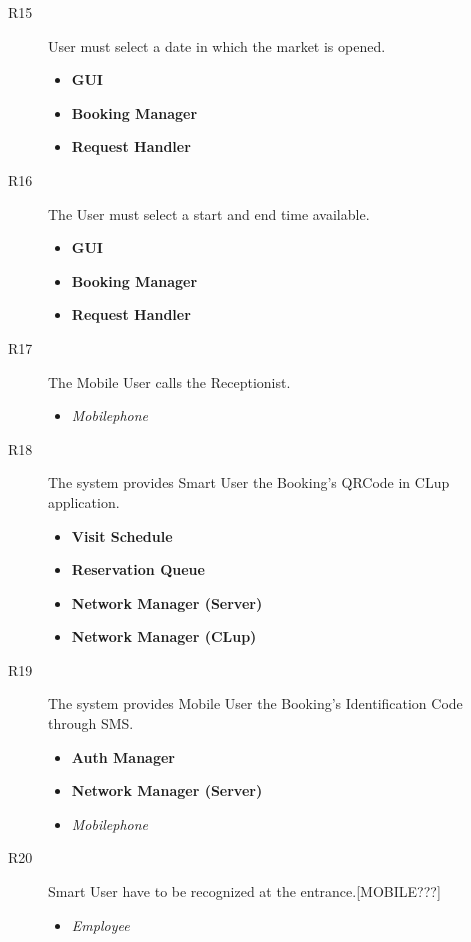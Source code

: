 \begin{description}
\item[R15] User must select a date in which the market is opened.
    \begin{itemize}
        \item \textbf{GUI}
        \item \textbf{Booking Manager}
        \item \textbf{Request Handler}
    \end{itemize}


\item[R16] The User must select a start and end time available.
    \begin{itemize}
        \item \textbf{GUI}
        \item \textbf{Booking Manager}
        \item \textbf{Request Handler}
    \end{itemize}


\item[R17] The Mobile User calls the Receptionist.
    \begin{itemize}
        \item \textit{Mobilephone}
  \end{itemize}

\item[R18] The system provides Smart User the Booking’s QRCode in CLup application.
    \begin{itemize}
        \item \textbf{Visit Schedule}
        \item \textbf{Reservation Queue}
        \item \textbf{Network Manager (Server)}
        \item \textbf{Network Manager (CLup)}
  \end{itemize}


\item[R19] The system provides Mobile User the Booking’s Identification Code through SMS.
    \begin{itemize}
        \item \textbf{Auth Manager}
        \item \textbf{Network Manager (Server)}
        \item \textit{Mobilephone}
    \end{itemize}



\item[R20] Smart User have to be recognized at the entrance.[MOBILE???]
    \begin{itemize}
        \item \textit{Employee}
    \end{itemize}



\end{description}
